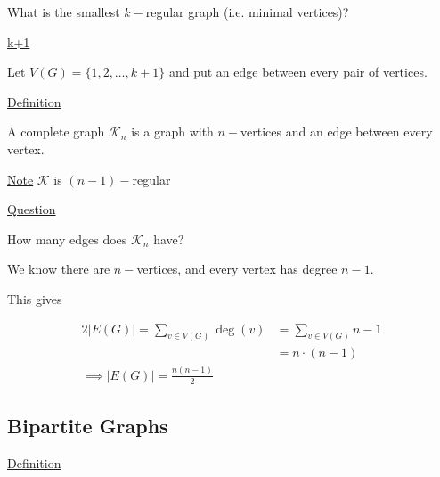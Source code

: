 \documentclass{article}
\begin{document}
What is the smallest $k-$regular graph (i.e. minimal vertices)?

\underline{k+1}

Let $V(G) = \{1,2,\ldots, k+1\}$ and put an edge between every pair of vertices. 

\underline{Definition}

A complete graph $\mathcal{K}_n$ is a graph with $n-$vertices and an edge between every vertex. 

\underline{Note} $\mathcal{K}$ is $(n-1)-$regular


\begin{center}
\end{center}


\underline{Question}

How many edges does $\mathcal{K}_n$ have?

We know there are $n-$vertices, and every vertex has degree $n-1$.

This gives

\begin{align*}
    2 |E(G)| = \sum_{v \in V(G)}\deg(v) &= \sum_{v \in V(G)} n-1 \\
    &= n \cdot (n-1)  \\
    \implies |E(G)| = \frac{n(n-1)}{2}
\end{align*}

\subsection{Bipartite Graphs}

\underline{Definition}
\end{document}

